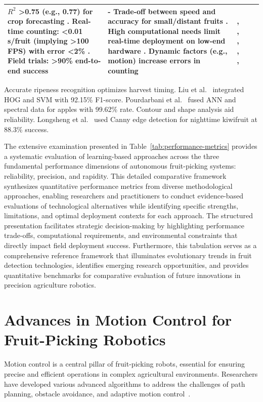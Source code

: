 \documentclass{ieeeaccess}
\begin{document}
\begin{table}[htbp]
\begin{tabularx}{\textwidth}{l X X X c}
$R^2$ >0.75 (e.g., 0.77) for crop forecasting \cite{underwood2016mapping}. Real-time counting: <0.01 s/fruit (implying >100 FPS) with error <2\% \cite{altaheri2019date}. Field trials: >90\% end-to-end success \cite{birrell2020field} & - Trade-off between speed and accuracy for small/distant fruits \cite{kang2020real}. High computational needs limit real-time deployment on low-end hardware \cite{altaheri2019date}. Dynamic factors (e.g., motion) increase errors in counting \cite{underwood2016mapping} & \cite{underwood2016mapping}, \cite{lin2019guava}, \cite{kang2019fruit}, \cite{kang2020real}, \cite{altaheri2019date}, \cite{birrell2020field} \\ \bottomrule
\end{tabularx}
\end{table}
\fi

Accurate ripeness recognition optimizes harvest timing. 
Liu et al.~\cite{liu2019mature} integrated HOG and SVM with 92.15\% F1-score. 
Pourdarbani et al.~\cite{pourdarbani2020automatic} fused ANN and spectral data for apples with 99.62\% rate.
Contour and shape analysis aid reliability. 
Longsheng et al.~\cite{longsheng2015kiwifruit} used Canny edge detection for nighttime kiwifruit at 88.3\% success.


The extensive examination presented in Table~\ref{tab:performance-metrics} provides a systematic evaluation of learning-based approaches across the three fundamental performance dimensions of autonomous fruit-picking systems: reliability, precision, and rapidity. This detailed comparative framework synthesizes quantitative performance metrics from diverse methodological approaches, enabling researchers and practitioners to conduct evidence-based evaluations of technological alternatives while identifying specific strengths, limitations, and optimal deployment contexts for each approach. The structured presentation facilitates strategic decision-making by highlighting performance trade-offs, computational requirements, and environmental constraints that directly impact field deployment success. Furthermore, this tabulation serves as a comprehensive reference framework that illuminates evolutionary trends in fruit detection technologies, identifies emerging research opportunities, and provides quantitative benchmarks for comparative evaluation of future innovations in precision agriculture robotics.

\section{Advances in Motion Control for Fruit-Picking Robotics}
Motion control is a central pillar of fruit-picking robots, essential for ensuring precise and efficient operations in complex agricultural environments. Researchers have developed various advanced algorithms to address the challenges of path planning, obstacle avoidance, and adaptive motion control~\cite{Ahmad:2023_bnb, Loganathan:2024_hho_avoa, Teo:2020, Arrouch:2022b, 10746490}.
\end{document}
